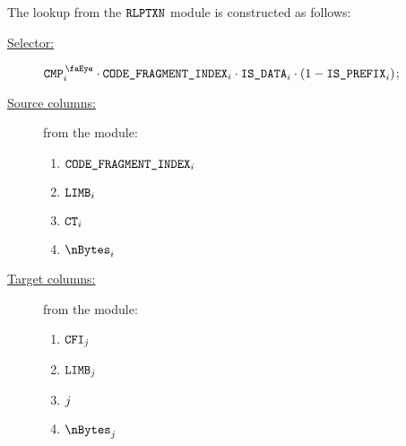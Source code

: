 The lookup from the $\texttt{RLPTXN}$ module is constructed as follows:
\begin{description}
	\item[\underline{Selector:}] $\isCmp_{i} \cdot \CFI{}_{i} \cdot \phaseData_{i} \cdot (1 - \rlpTxnSharedColumnIsPrefix_{i})$;
	\item[\underline{Source columns:}] from the \rlpTxnMod{} module:
	\begin{multicols}{3}
	\begin{enumerate}
		\item $\texttt{CODE\_FRAGMENT\_INDEX}{}_{i}$
		\item $\texttt{LIMB}_{i}$
		\item $\texttt{CT}_{i}$
		\item $\nBytes_{i}$
	\end{enumerate}
	\end{multicols}
\item[\underline{Target columns:}] from the \romMod{} module: 
	\begin{multicols}{3}
	\begin{enumerate}
		\item $\texttt{CFI}_{j}$
		\item $\texttt{LIMB}_{j}$
		\item $\index_{j}$
		\item $\nBytes_{j}$
	\end{enumerate} 
	\end{multicols}
\end{description}
